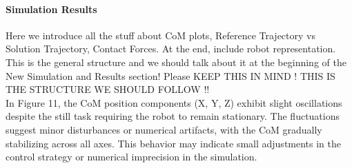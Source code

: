 \documentclass[main.tex]{subfiles}
\begin{document}
\paragraph{Simulation Results}
Here we introduce all the stuff about CoM plots, Reference Trajectory vs Solution Trajectory, Contact Forces. At the end, include robot representation. 
This is the general structure and we should talk about it at the beginning of the New Simulation and Results section! 
Please KEEP THIS IN MIND ! THIS IS THE STRUCTURE WE SHOULD FOLLOW !! \\
In Figure 11, the CoM position components (X, Y, Z) exhibit slight oscillations despite the still task requiring the robot to remain stationary. The fluctuations suggest minor disturbances or numerical artifacts, with the CoM gradually stabilizing across all axes. This behavior may indicate small adjustments in the control strategy or numerical imprecision in the simulation.
\end{document}
